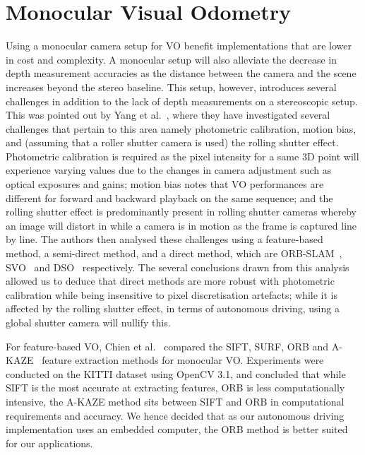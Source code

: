 \section{Monocular Visual Odometry}
Using a monocular camera setup for VO benefit implementations that are lower in cost and complexity. A monocular setup will also alleviate the decrease in depth measurement accuracies as the distance between the camera and the scene increases beyond the stereo baseline. This setup, however, introduces several challenges in addition to the lack of depth measurements on a stereoscopic setup. This was pointed out by Yang et al.~\cite{yang_challenges_2017}, where they have investigated several challenges that pertain to this area namely photometric calibration, motion bias, and (assuming that a roller shutter camera is used) the rolling shutter effect. Photometric calibration is required as the pixel intensity for a same 3D point will experience varying values due to the changes in camera adjustment such as optical exposures and gains; motion bias notes that VO performances are different for forward and backward playback on the same sequence; and the rolling shutter effect is predominantly present in rolling shutter cameras whereby an image will distort in while a camera is in motion as the frame is captured line by line. The authors then analysed these challenges using a feature-based method, a semi-direct method, and a direct method, which are ORB-SLAM~\cite{mur-artal_orb-slam2:_2017}, SVO~\cite{forster_svo:_2017} and DSO~\cite{engel_direct_2018} respectively. The several conclusions drawn from this analysis allowed us to deduce that direct methods are more robust with photometric calibration while being insensitive to pixel discretisation artefacts; while it is affected by the rolling shutter effect, in terms of autonomous driving, using a global shutter camera will nullify this. 


For feature-based VO, Chien et al.~\cite{chien_when_2016} compared the SIFT, SURF, ORB and A-KAZE~\cite{alcantarilla_fast_2013} feature extraction methods for monocular VO. Experiments were conducted on the KITTI dataset using OpenCV 3.1, and concluded that while SIFT is the most accurate at extracting features, ORB is less computationally intensive, the A-KAZE method sits between SIFT and ORB in computational requirements and accuracy. We hence decided that as our autonomous driving implementation uses an embedded computer, the ORB method is better suited for our applications. 


